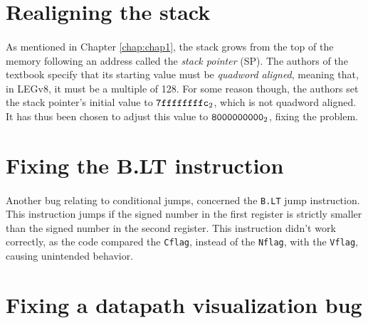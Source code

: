 \section{Realigning the stack}
\paragraph{}
As mentioned in Chapter \ref{chap:chap1}, the stack grows from the top of the memory following an address called the \emph{stack pointer} (SP). The authors of the textbook \cite{patterson2016computer} specify that its starting value must be \emph{quadword aligned}, meaning that, in LEGv8, it must be a multiple of 128. For some reason though, the authors set the stack pointer's initial value to $\verb|7ffffffffc|_2$, which is not quadword aligned. It has thus been chosen to adjust this value to $\verb|8000000000|_2$, fixing the problem.
\section{Fixing the B.LT instruction}
\paragraph{}
Another bug relating to conditional jumps, concerned the \verb|B.LT| jump instruction. This instruction jumps if the signed number in the first register is strictly smaller than the signed number in the second register. This instruction didn't work correctly, as the code compared the \verb|Cflag|, instead of the \verb|Nflag|, with the \verb|Vflag|, causing unintended behavior.
\section{Fixing a datapath visualization bug}
